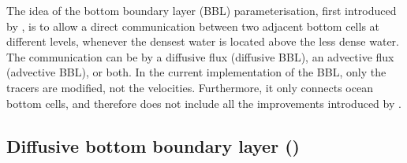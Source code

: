 \documentclass[../tex_main/NEMO_manual]{subfiles}
\begin{document}
The idea of the bottom boundary layer (BBL) parameterisation, first introduced by \citet{Beckmann_Doscher1997},
is to allow a direct communication between two adjacent bottom cells at different levels,
whenever the densest water is located above the less dense water.
The communication can be by a diffusive flux (diffusive BBL), an advective flux (advective BBL), or both.
In the current implementation of the BBL, only the tracers are modified, not the velocities.
Furthermore, it only connects ocean bottom cells, and therefore does not include all the improvements introduced by
\citet{Campin_Goosse_Tel99}.

\subsection{Diffusive bottom boundary layer (\protect{})}
\label{subsec:TRA_bbl_diff}
\end{document}
